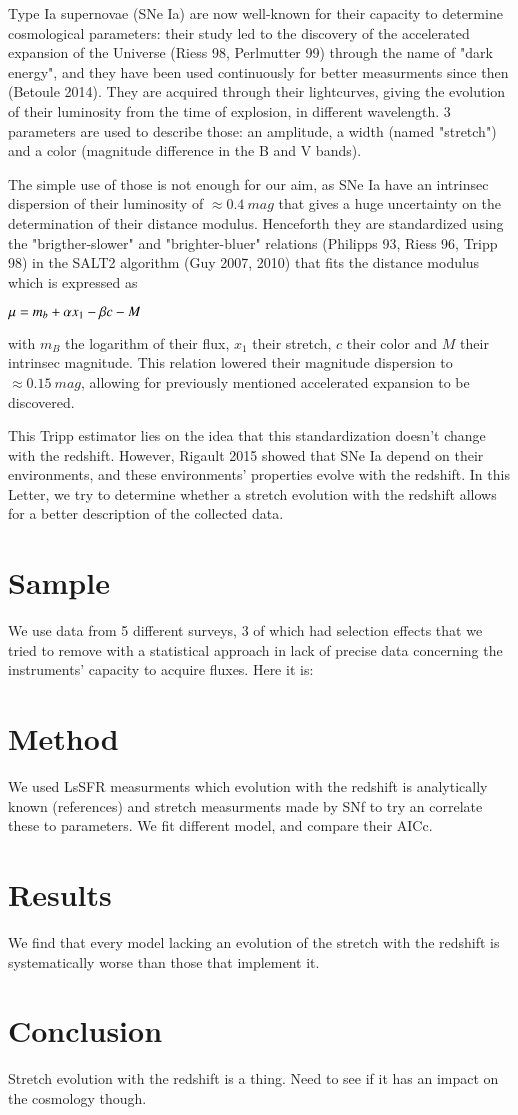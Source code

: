 \documentclass{aa}
\begin{document}
Type Ia supernovae (SNe Ia) are now well-known for their capacity to determine
cosmological parameters: their study led to the discovery of the accelerated
expansion of the Universe (Riess 98, Perlmutter 99) through the name of "dark
energy", and they have been used continuously for better measurments since then
(Betoule 2014). They are acquired through their lightcurves, giving the
evolution of their luminosity from the time of explosion, in different
wavelength. 3 parameters are used to describe those: an amplitude, a width
(named "stretch") and a color (magnitude difference in the B and V bands).

The simple use of those is not enough for our aim, as SNe Ia have an intrinsec
dispersion of their luminosity of $\approx \SI{0.4}{mag}$ that gives a huge
uncertainty on the determination of their distance modulus. Henceforth they are
standardized using the "brigther-slower" and "brighter-bluer" relations
(Philipps 93, Riess 96, Tripp 98) in the SALT2 algorithm (Guy 2007, 2010) that
fits the distance modulus which is expressed as
\begin{center}
    $ \displaystyle \mu = m_b + \alpha x_1 - \beta c - M$
\end{center}
with $m_B$ the logarithm of their flux, $x_1$ their stretch, $c$ their color and
$M$ their intrinsec magnitude. This relation lowered their magnitude dispersion
to $\approx \SI{0.15}{mag}$, allowing for previously mentioned accelerated
expansion to be discovered.

This Tripp estimator lies on the idea that this standardization doesn't change
with the redshift. However, Rigault 2015 showed that SNe Ia depend on their
environments, and these environments' properties evolve with the redshift. In
this Letter, we try to determine whether a stretch evolution with the redshift
allows for a better description of the collected data.

\section{Sample}
We use data from 5 different surveys, 3 of which had selection effects that we
tried to remove with a statistical approach in lack of precise data concerning
the instruments' capacity to acquire fluxes. Here it is:

\section{Method}
We used LsSFR measurments which evolution with the redshift is analytically
known (references) and stretch measurments made by SNf to try an correlate these
to parameters. We fit different model, and compare their AICc.

\section{Results}
We find that every model lacking an evolution of the stretch with the redshift
is systematically worse than those that implement it.

\section{Conclusion}
Stretch evolution with the redshift is a thing. Need to see if it has an impact
on the cosmology though.
\end{document}
